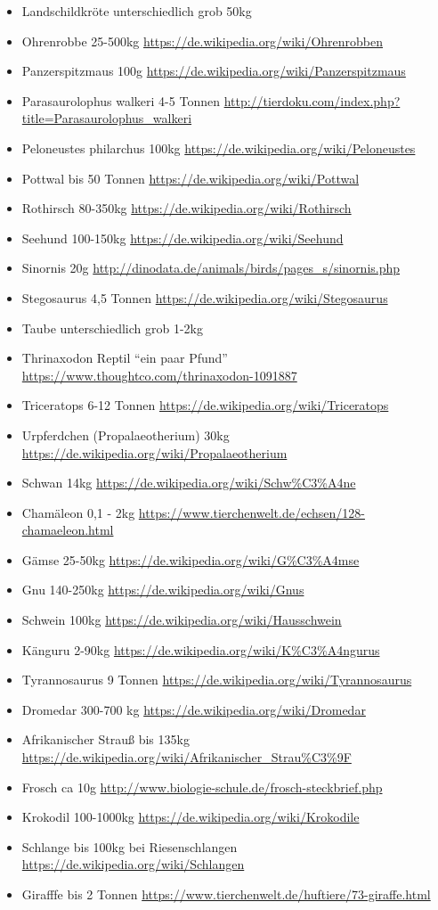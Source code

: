 \begin{itemize}
  \item Landschildkröte unterschiedlich grob 50kg
  \item Ohrenrobbe 25-500kg \url{https://de.wikipedia.org/wiki/Ohrenrobben}
  \item Panzerspitzmaus 100g \url{https://de.wikipedia.org/wiki/Panzerspitzmaus}
  \item Parasaurolophus walkeri 4-5 Tonnen \url{http://tierdoku.com/index.php?title=Parasaurolophus_walkeri}
  \item Peloneustes philarchus 100kg \url{https://de.wikipedia.org/wiki/Peloneustes}
  \item Pottwal bis 50 Tonnen \url{https://de.wikipedia.org/wiki/Pottwal}
  \item Rothirsch 80-350kg \url{https://de.wikipedia.org/wiki/Rothirsch}
  \item Seehund 100-150kg \url{https://de.wikipedia.org/wiki/Seehund}
  \item Sinornis 20g \url{http://dinodata.de/animals/birds/pages_s/sinornis.php}
  \item Stegosaurus 4,5 Tonnen \url{https://de.wikipedia.org/wiki/Stegosaurus}
  \item Taube unterschiedlich grob 1-2kg
  \item Thrinaxodon Reptil "`ein paar Pfund"' \url{https://www.thoughtco.com/thrinaxodon-1091887}
  \item Triceratops 6-12 Tonnen \url{https://de.wikipedia.org/wiki/Triceratops}
  \item Urpferdchen (Propalaeotherium) 30kg \url{https://de.wikipedia.org/wiki/Propalaeotherium}
  \item Schwan 14kg \url{https://de.wikipedia.org/wiki/Schw\%C3\%A4ne}
  \item Chamäleon 0,1 - 2kg \url{https://www.tierchenwelt.de/echsen/128-chamaeleon.html}
  \item Gämse 25-50kg \url{https://de.wikipedia.org/wiki/G\%C3\%A4mse}
  \item Gnu 140-250kg \url{https://de.wikipedia.org/wiki/Gnus}
  \item Schwein 100kg \url{https://de.wikipedia.org/wiki/Hausschwein}
  \item Känguru 2-90kg \url{https://de.wikipedia.org/wiki/K\%C3\%A4ngurus}
  \item Tyrannosaurus 9 Tonnen \url{https://de.wikipedia.org/wiki/Tyrannosaurus}
  \item Dromedar 300-700 kg \url{https://de.wikipedia.org/wiki/Dromedar}
  \item Afrikanischer Strauß bis 135kg \url{https://de.wikipedia.org/wiki/Afrikanischer_Strau\%C3\%9F}
  \item Frosch ca 10g \url{http://www.biologie-schule.de/frosch-steckbrief.php}
  \item Krokodil 100-1000kg \url{https://de.wikipedia.org/wiki/Krokodile}
  \item Schlange bis 100kg bei Riesenschlangen \url{https://de.wikipedia.org/wiki/Schlangen}
  \item Girafffe bis 2 Tonnen \url{https://www.tierchenwelt.de/huftiere/73-giraffe.html}
 \end{itemize}
 
